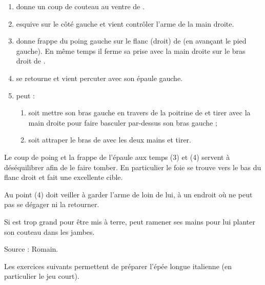 \begin{technique}

\begin{enumerate}
	\item \A donne un coup de couteau au ventre de \D.
	
	\item \D esquive sur le côté gauche et vient contrôler l'arme de la main droite.
	
	\item \D donne frappe du poing gauche sur le flanc (droit) de \A (en avançant le pied gauche).
	En même temps il ferme sa prise avec la main droite sur le bras droit de \A.
	
	\item \D se retourne et vient percuter \A avec son épaule gauche.
	
	\item \D peut :
	\begin{enumerate}
		\item soit mettre son bras gauche en travers de la poitrine de \A et tirer avec la main droite pour faire basculer \A par-dessus son bras gauche ;
		
		\item soit attraper le bras de \A avec les deux mains et tirer.
	\end{enumerate}

\end{enumerate}

Le coup de poing et la frappe de l'épaule aux temps (3) et (4) servent à déséquilibrer \A afin de le faire tomber.
En particulier le foie se trouve vers le bas du flanc droit et fait une excellente cible.

Au point (4) \D doit veiller à garder l'arme de \A loin de lui, à un endroit où \A ne peut pas se dégager ni la retourner.

Si \A est trop grand pour être mis à terre, \D peut ramener ses mains pour lui planter son couteau dans les jambes.

Source : Romain.

\end{technique}


Les exercices suivants permettent de préparer l'épée longue italienne (en particulier le jeu court).

